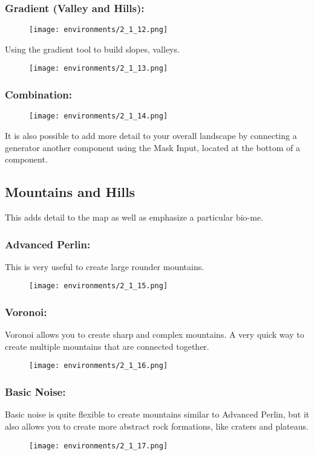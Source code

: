 \documentclass[../main.tex]{subfiles}
\begin{document}
\subsubsection{Gradient (Valley and Hills):}
\begin{figure}[H]
\texttt{[image: environments/2\_1\_12.png]}
\end{figure}
Using the gradient tool to build slopes, valleys.
\begin{figure}[H]
\texttt{[image: environments/2\_1\_13.png]}
\end{figure}
\subsubsection{Combination:}
\begin{figure}[H]
\texttt{[image: environments/2\_1\_14.png]}
\end{figure}
It is also possible to add more detail to your overall landscape by connecting a generator another component using the Mask Input, located at the bottom of a component.

\subsection{Mountains and Hills}
This adds detail to the map as well as emphasize a particular bio-me.
\subsubsection{Advanced Perlin:}
This is very useful to create large rounder mountains.
\begin{figure}[H]
\texttt{[image: environments/2\_1\_15.png]}
\end{figure}
\subsubsection{Voronoi:}
Voronoi allows you to create sharp and complex mountains. A very quick way to create multiple mountains that are connected together.
\begin{figure}[H]
\texttt{[image: environments/2\_1\_16.png]}
\end{figure}

\subsubsection{Basic Noise:}
Basic noise is quite flexible to create mountains similar to Advanced Perlin, but it also allows you to create more abstract rock formations, like craters and plateaus.
\begin{figure}[H]
\texttt{[image: environments/2\_1\_17.png]}
\end{figure}
\end{document}
